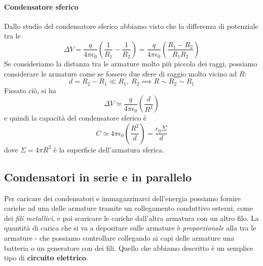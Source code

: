 \paragraph{Condensatore sferico}
Dallo studio del condensatore sferico %
abbiamo visto che la differenza di potenziale tra le 
\begin{equation*}
	\Delta V=\frac{q}{4\pi\epsilon_0}\left(\frac{1}{R_1}-\frac{1}{R_2}\right)=\frac{q}{4\pi\epsilon_0}\left(\frac{R_1-R_2}{R_1R_2}\right)
\end{equation*}
Se consideriamo la distanza tra le armature molto più piccola dei raggi, possiamo considerare le armature come se fossero due sfere di raggio molto vicino ad $R$:
\begin{equation*}
	d=R_2-R_1\ll R_1,\ R_2\implies R\sim R_2\sim R_1
\end{equation*}
Fissato ciò, si ha
\begin{equation*}
	\Delta V\simeq\frac{q}{4\pi\epsilon_0}\left(\frac{d}{R^2}\right)
\end{equation*}
e quindi la capacità del condensatore sferico è
\begin{equation}
	C\simeq 4\pi\epsilon_0\left(\frac{R^2}{d}\right)=\frac{\epsilon_0\Sigma}{d}
\end{equation}
dove $\Sigma=4\pi R^2$ è la superficie dell'armatura sferica.
\subsection{Condensatori in serie e in parallelo}\label{condensatoreSerieParallelo}
Per caricare dei condensatori e immagazzinarci dell'energia possiamo fornire cariche ad una delle armature tramite un collegamento conduttivo esterni, come dei \textit{fili metallici}, e poi scaricare le cariche dall'altra armatura con un altro filo. La quantità di carica che si va a depositare sulle armature è \textit{proporzionale} alla \ddp tra le armature - che possiamo controllare collegando ai capi delle armature una batteria o un generatore con dei fili. Quello che abbiamo descritto è un semplice tipo di \textbf{circuito elettrico}.

